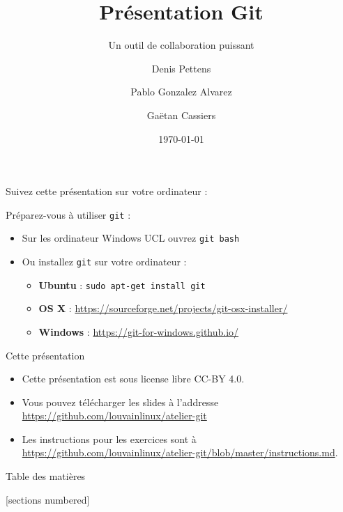 \documentclass{beamer}
\title{Présentation Git}
\subtitle{Un outil de collaboration puissant}
\date{\today}
\author{Denis Pettens \and Pablo Gonzalez Alvarez \and Gaëtan Cassiers}
\institute{Louvain-li-Nux}
\begin{document}
\begin{frame}
\begin{center}
  Suivez cette présentation sur votre ordinateur :
   \vspace{1cm}
\end{center}

Préparez-vous à utiliser \texttt{git} :
\begin{itemize}
    \item Sur les ordinateur Windows UCL ouvrez \texttt{git bash}
    \item Ou installez \texttt{git} sur votre ordinateur :
    \begin{itemize}
        \item \textbf{Ubuntu} : \lstinline{sudo apt-get install git}
        \item \textbf{OS X} : \url{https://sourceforge.net/projects/git-osx-installer/}
        \item \textbf{Windows} : \url{https://git-for-windows.github.io/}
    \end{itemize}
\end{itemize}
\end{frame}

\maketitle

\begin{frame}{Cette présentation}
    \begin{itemize}
        \item Cette présentation est sous license libre CC-BY 4.0.
        \item Vous pouvez télécharger les slides à l'addresse
            \url{https://github.com/louvainlinux/atelier-git}
        \item Les instructions pour les exercices sont à
        \url{https://github.com/louvainlinux/atelier-git/blob/master/instructions.md}.
    \end{itemize}
\end{frame}

\begin{frame}{Table des matières}

[sections numbered]
\tableofcontents[hideallsubsections]

\end{frame}
\end{document}
